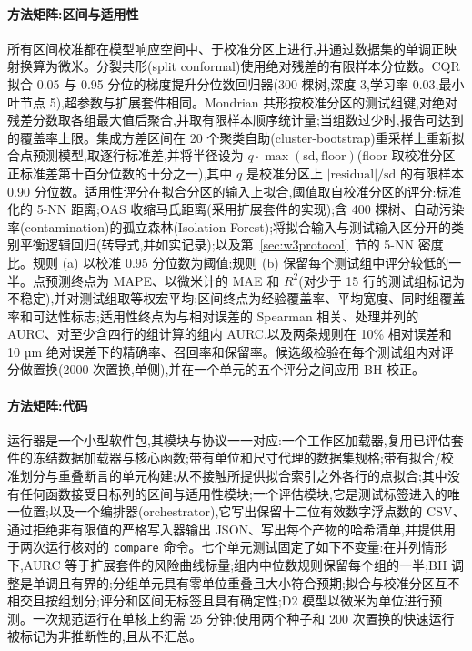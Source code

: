 \documentclass[11pt,a4paper]{ctexart}
\begin{document}
\paragraph{方法矩阵:区间与适用性} 所有区间校准都在模型响应空间中、于校准分区上进行,并通过数据集的单调正映射换算为微米。分裂共形(split conformal)使用绝对残差的有限样本分位数。CQR 拟合 0.05 与 0.95 分位的梯度提升分位数回归器(300 棵树,深度 3,学习率 0.03,最小叶节点 5),超参数与扩展套件相同。Mondrian 共形按校准分区的测试组键,对绝对残差分数取各组最大值后聚合,并取有限样本顺序统计量;当组数过少时,报告可达到的覆盖率上限。集成方差区间在 20 个聚类自助(cluster-bootstrap)重采样上重新拟合点预测模型,取逐行标准差,并将半径设为 $q\cdot\max(\mathrm{sd},\mathrm{floor})$(floor 取校准分区正标准差第十百分位数的十分之一),其中 $q$ 是校准分区上 $|\mathrm{residual}|/\mathrm{sd}$ 的有限样本 0.90 分位数。适用性评分在拟合分区的输入上拟合,阈值取自校准分区的评分:标准化的 5-NN 距离;OAS 收缩马氏距离(采用扩展套件的实现);含 400 棵树、自动污染率(contamination)的孤立森林(Isolation Forest);将拟合输入与测试输入区分开的类别平衡逻辑回归(转导式,并如实记录);以及第~\ref{sec:w3protocol}~节的 5-NN 密度比。规则 (a) 以校准 0.95 分位数为阈值;规则 (b) 保留每个测试组中评分较低的一半。点预测终点为 MAPE、以微米计的 MAE 和 $R^2$(对少于 15 行的测试组标记为不稳定),并对测试组取等权宏平均;区间终点为经验覆盖率、平均宽度、同时组覆盖率和可达性标志;适用性终点为与相对误差的 Spearman 相关、处理并列的 AURC、对至少含四行的组计算的组内 AURC,以及两条规则在 10\% 相对误差和 10 µm 绝对误差下的精确率、召回率和保留率。候选级检验在每个测试组内对评分做置换(2000 次置换,单侧),并在一个单元的五个评分之间应用 BH 校正。

\paragraph{方法矩阵:代码} 运行器是一个小型软件包,其模块与协议一一对应:一个工作区加载器,复用已评估套件的冻结数据加载器与核心函数;带有单位和尺寸代理的数据集规格;带有拟合/校准划分与重叠断言的单元构建;从不接触所提供拟合索引之外各行的点拟合;其中没有任何函数接受目标列的区间与适用性模块;一个评估模块,它是测试标签进入的唯一位置;以及一个编排器(orchestrator),它写出保留十二位有效数字浮点数的 CSV、通过拒绝非有限值的严格写入器输出 JSON、写出每个产物的哈希清单,并提供用于两次运行核对的 \texttt{compare} 命令。七个单元测试固定了如下不变量:在并列情形下,AURC 等于扩展套件的风险曲线标量;组内中位数规则保留每个组的一半;BH 调整是单调且有界的;分组单元具有零单位重叠且大小符合预期;拟合与校准分区互不相交且按组划分;评分和区间无标签且具有确定性;D2 模型以微米为单位进行预测。一次规范运行在单核上约需 25 分钟;使用两个种子和 200 次置换的快速运行被标记为非推断性的,且从不汇总。
\end{document}
